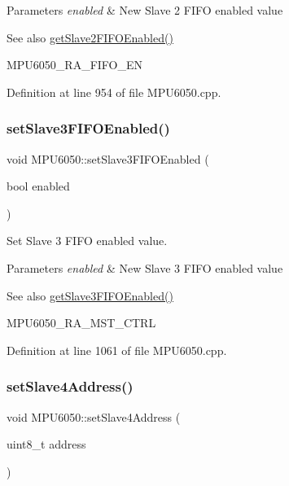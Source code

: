 \begin{DoxyParams}{Parameters}
{\em enabled} & New Slave 2 F\+I\+FO enabled value \\
\hline
\end{DoxyParams}
\begin{DoxySeeAlso}{See also}
\mbox{\hyperlink{classMPU6050_a3c2e29508607a655221a2fa4f4219b4d}{get\+Slave2\+F\+I\+F\+O\+Enabled()}} 

M\+P\+U6050\+\_\+\+R\+A\+\_\+\+F\+I\+F\+O\+\_\+\+EN 
\end{DoxySeeAlso}


Definition at line 954 of file M\+P\+U6050.\+cpp.

\mbox{\label{classMPU6050_a6ed713870c7f6d085ded91a45515a36c}} 
\subsubsection{\texorpdfstring{setSlave3FIFOEnabled()}{setSlave3FIFOEnabled()}}
{\footnotesize\ttfamily void M\+P\+U6050\+::set\+Slave3\+F\+I\+F\+O\+Enabled (\begin{DoxyParamCaption}\item[{bool}]{enabled }\end{DoxyParamCaption})}



Set Slave 3 F\+I\+FO enabled value. 


\begin{DoxyParams}{Parameters}
{\em enabled} & New Slave 3 F\+I\+FO enabled value \\
\hline
\end{DoxyParams}
\begin{DoxySeeAlso}{See also}
\mbox{\hyperlink{classMPU6050_a9d75ec63e2320ecfb84a2b082397f900}{get\+Slave3\+F\+I\+F\+O\+Enabled()}} 

M\+P\+U6050\+\_\+\+R\+A\+\_\+\+M\+S\+T\+\_\+\+C\+T\+RL 
\end{DoxySeeAlso}


Definition at line 1061 of file M\+P\+U6050.\+cpp.

\mbox{\label{classMPU6050_a6985da2cbc37be3fefbe3c16bf8d34a6}} 
\subsubsection{\texorpdfstring{setSlave4Address()}{setSlave4Address()}}
{\footnotesize\ttfamily void M\+P\+U6050\+::set\+Slave4\+Address (\begin{DoxyParamCaption}\item[{uint8\+\_\+t}]{address }\end{DoxyParamCaption})}




